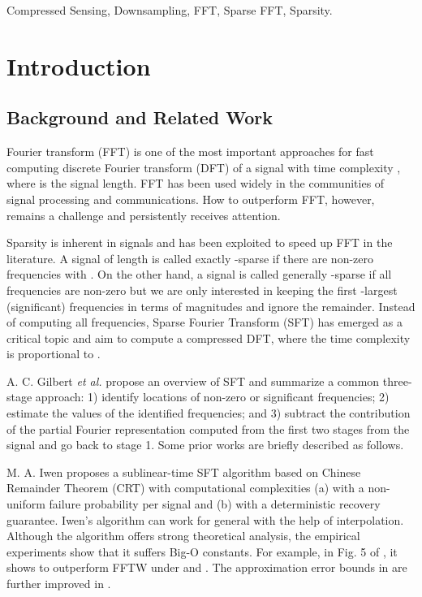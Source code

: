 \documentclass[journal,onecolumn,11pt]{IEEEtran}
\begin{document}
\begin{IEEEkeywords}
Compressed Sensing, Downsampling, FFT, Sparse FFT, Sparsity.
\end{IEEEkeywords}


\IEEEpeerreviewmaketitle


\section{Introduction}\label{sec:intro}
\subsection{Background and Related Work}
 Fourier transform (FFT) is one of the most important approaches for fast computing discrete Fourier transform (DFT) of a signal with time complexity , where  is the signal length.
FFT has been used widely in the communities of signal processing and communications.
How to outperform FFT, however, remains a challenge and persistently receives attention.

Sparsity is inherent in signals and has been exploited to speed up FFT in the literature.
A signal of length  is called exactly -sparse if there are  non-zero frequencies with .
On the other hand, a signal is called generally -sparse if all frequencies are non-zero but we are only interested in keeping the first -largest (significant) frequencies in terms of magnitudes and ignore the remainder.
Instead of computing all frequencies, Sparse Fourier Transform (SFT) has emerged as a critical topic and aim to compute a compressed DFT, where the time complexity is proportional to .

A. C. Gilbert \cite{Gilbert2014} {\em et al.} propose an overview of SFT and summarize a common three-stage approach:
1) identify locations of non-zero or significant frequencies;
2) estimate the values of the identified frequencies; and
3) subtract the contribution of the partial Fourier representation computed from the first two stages from the signal and go back to stage 1.
Some prior works are briefly described as follows.

M. A. Iwen \cite{Iwen2010} proposes a sublinear-time SFT algorithm based on Chinese Remainder Theorem (CRT) with computational complexities
(a)  with a non-uniform failure probability per signal and
(b)  with a deterministic recovery guarantee.
Iwen's algorithm can work for general  with the help of interpolation.
Although the algorithm offers strong theoretical analysis, the empirical experiments show that it suffers Big-O constants. For example, in Fig. 5 of \cite{Iwen2010}, it shows to outperform FFTW under  and .
The approximation error bounds in \cite{Iwen2010} are further improved in \cite{Iwen2013}.
\end{document}
